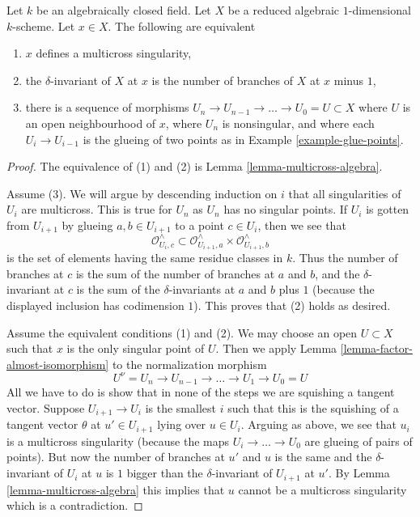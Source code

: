 \begin{lemma}
\label{lemma-multicross}
Let $k$ be an algebraically closed field. Let $X$ be a reduced algebraic
$1$-dimensional $k$-scheme. Let $x \in X$. The following are equivalent
\begin{enumerate}
\item $x$ defines a multicross singularity,
\item the $\delta$-invariant of $X$ at $x$ is the
number of branches of $X$ at $x$ minus $1$,
\item there is a sequence of morphisms
$U_n \to U_{n - 1} \to \ldots \to U_0 = U \subset X$
where $U$ is an open neighbourhood of $x$, where
$U_n$ is nonsingular, and where each $U_i \to U_{i - 1}$
is the glueing of two points as in Example \ref{example-glue-points}.
\end{enumerate}
\end{lemma}

\begin{proof}
The equivalence of (1) and (2) is Lemma \ref{lemma-multicross-algebra}.

\medskip\noindent
Assume (3). We will argue by descending induction on $i$ that all singularities
of $U_i$ are multicross. This is true for $U_n$ as $U_n$ has no singular points.
If $U_i$ is gotten from $U_{i + 1}$ by glueing $a, b \in U_{i + 1}$
to a point $c \in U_i$, then we see that
$$
\mathcal{O}_{U_i, c}^\wedge \subset
\mathcal{O}_{U_{i + 1}, a}^\wedge \times \mathcal{O}_{U_{i + 1}, b}^\wedge
$$
is the set of elements having the same residue classes in $k$.
Thus the number of branches at $c$ is the sum of the number of
branches at $a$ and $b$, and the $\delta$-invariant at $c$
is the sum of the $\delta$-invariants at $a$ and $b$ plus $1$
(because the displayed inclusion has codimension $1$).
This proves that (2) holds as desired.

\medskip\noindent
Assume the equivalent conditions (1) and (2). We may choose an open
$U \subset X$ such that $x$ is the only singular point of $U$.
Then we apply Lemma \ref{lemma-factor-almost-isomorphism} to
the normalization morphism
$$
U^\nu = U_n \to U_{n - 1} \to \ldots \to U_1 \to U_0 = U
$$
All we have to do is show that in none of the steps we are
squishing a tangent vector. Suppose $U_{i + 1} \to U_i$ is the
smallest $i$ such that this is the squishing of a tangent
vector $\theta$ at $u' \in U_{i + 1}$ lying over $u \in U_i$.
Arguing as above, we see that $u_i$ is a multicross singularity
(because the maps $U_i \to \ldots \to U_0$ are glueing of
pairs of points). But now the number of branches at $u'$ and $u$
is the same and the $\delta$-invariant of $U_i$ at $u$
is $1$ bigger than the $\delta$-invariant of $U_{i + 1}$ at $u'$.
By Lemma \ref{lemma-multicross-algebra}
this implies that $u$ cannot be a multicross singularity which
is a contradiction.
\end{proof}






